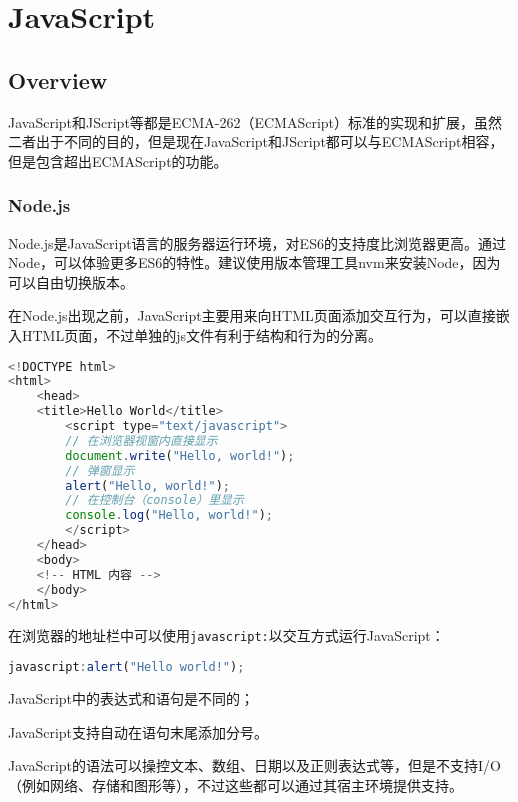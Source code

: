 \part{JavaScript}

\chapter{Overview}


JavaScript和JScript等都是ECMA-262（ECMAScript）标准的实现和扩展，虽然二者出于不同的目的，但是现在JavaScript和JScript都可以与ECMAScript相容，但是包含超出ECMAScript的功能。



\section{Node.js}

Node.js是JavaScript语言的服务器运行环境，对ES6的支持度比浏览器更高。通过Node，可以体验更多ES6的特性。建议使用版本管理工具nvm来安装Node，因为可以自由切换版本。



在Node.js出现之前，JavaScript主要用来向HTML页面添加交互行为，可以直接嵌入HTML页面，不过单独的js文件有利于结构和行为的分离。

\begin{lstlisting}[language=JavaScript]
<!DOCTYPE html>
<html>
    <head>
    <title>Hello World</title>
        <script type="text/javascript">
        // 在浏览器视窗内直接显示
        document.write("Hello, world!"); 
        // 弹窗显示
        alert("Hello, world!"); 
        // 在控制台（console）里显示
        console.log("Hello, world!");
        </script>
    </head>
    <body>
    <!-- HTML 内容 -->
    </body>
</html>
\end{lstlisting}

在浏览器的地址栏中可以使用\texttt{javascript:}以交互方式运行JavaScript：

\begin{lstlisting}[language=JavaScript]
javascript:alert("Hello world!");
\end{lstlisting}

\begin{compactitem}
\item JavaScript中的表达式和语句是不同的；
\item JavaScript支持自动在语句末尾添加分号。
\end{compactitem}


JavaScript的语法可以操控文本、数组、日期以及正则表达式等，但是不支持I/O（例如网络、存储和图形等），不过这些都可以通过其宿主环境提供支持。

